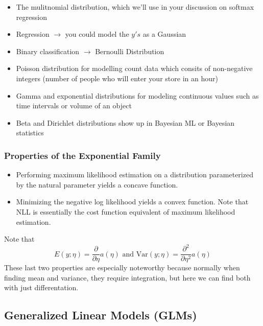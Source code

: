\documentclass[12pt]{scrartcl}
\begin{document}
\begin{itemize}
    \item The mulitnomial distribution, which we'll use in your discussion on softmax regression
    \item Regression $\to$ you could model the $y's$ as a Gaussian
    \item Binary classification $\to$ Bernoulli Distribution
    \item Poisson distribution for modelling count data which consits of non-negative integers (number of people who will enter your store in an hour)
    \item Gamma and exponential distributions for modeling continuous values such as time intervals or volume of an object
    \item Beta and Dirichlet distributions show up in Bayesian ML or Bayesian statistics
\end{itemize}

\subsubsection{Properties of the Exponential Family}
\begin{itemize}
    \item Performing maximum likelihood estimation on a distribution parameterized by the natural parameter yields a concave function.
    \item Minimizing the negative log likelihood yields a convex function. Note that NLL is essentially the cost function equivalent of maximum likelihood estimation.
\end{itemize}
\begin{note}
    Note that 
    \[E(y; \eta) = \frac{\partial}{\partial \eta}a(\eta) \text{ and Var}(y; \eta) = \frac{\partial^2}{\partial\eta^2}a(\eta)\]
    These last two properties are especially noteworthy because normally when finding mean and variance, they require integration, but here we can find both with just differentation.
\end{note}

\subsection{Generalized Linear Models (GLMs)}
\end{document}
